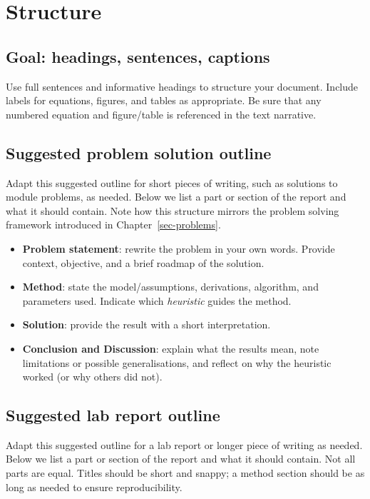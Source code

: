 \documentclass[
  a4paper,
  DIV=11,
  numbers=noendperiod,
  oneside]{scrreprt}
\providecommand{\tightlist}{%
  \setlength{\itemsep}{0pt}\setlength{\parskip}{0pt}}
\begin{document}
\section{Structure}\label{sec-writing-structure}

\subsection{Goal: headings, sentences,
captions}\label{goal-headings-sentences-captions}

Use full sentences and informative headings to structure your document.
Include labels for equations, figures, and tables as appropriate. Be
sure that any numbered equation and figure/table is referenced in the
text narrative.

\subsection{Suggested problem solution
outline}\label{suggested-problem-solution-outline}

Adapt this suggested outline for short pieces of writing, such as
solutions to module problems, as needed. Below we list a part or section
of the report and what it should contain. Note how this structure
mirrors the problem solving framework introduced in
Chapter~\ref{sec-problems}.

\begin{itemize}
\tightlist
\item
  \textbf{Problem statement}: rewrite the problem in your own words.
  Provide context, objective, and a brief roadmap of the solution.
\item
  \textbf{Method}: state the model/assumptions, derivations, algorithm,
  and parameters used. Indicate which \emph{heuristic} guides the
  method.
\item
  \textbf{Solution}: provide the result with a short interpretation.
\item
  \textbf{Conclusion and Discussion}: explain what the results mean,
  note limitations or possible generalisations, and reflect on why the
  heuristic worked (or why others did not).
\end{itemize}

\subsection{Suggested lab report
outline}\label{suggested-lab-report-outline}

Adapt this suggested outline for a lab report or longer piece of writing
as needed. Below we list a part or section of the report and what it
should contain. Not all parts are equal. Titles should be short and
snappy; a method section should be as long as needed to ensure
reproducibility.
\end{document}
